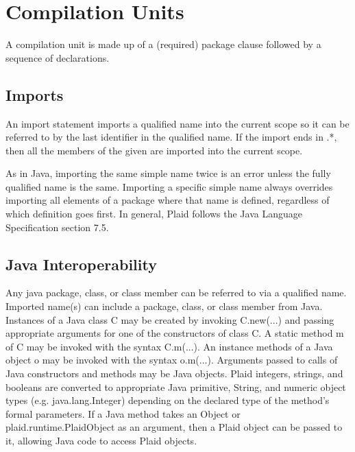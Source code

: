 \section{Compilation Units}

\begin{quote}


 {}  \code{;}  

\end{quote}

A compilation unit is made up of a (required) package clause followed
by a sequence of declarations.

\subsection{Imports}

\begin{quote}


 {}   \code{;}


 {}

\end{quote}

An import statement imports a qualified name into the current scope so
it can be referred to by the last identifier in the qualified name.
If the import ends in .*, then all the members of the given  are
imported into the current scope.

As in Java, importing the same simple name twice is an error unless
the fully qualified name is the same.  Importing a specific simple
name always overrides importing all elements of a package where
that name is defined, regardless of which definition goes first.
In general, Plaid follows the Java Language Specification section
7.5.

\subsection{Java Interoperability}

  Any java package, class, or
class member can be referred to via a qualified name.  Imported
name(s) can include a package, class, or class member from Java.
Instances of a Java class C may be created by invoking C.new(...)  and
passing appropriate arguments for one of the constructors of class C.
A static method m of C may be invoked with the syntax C.m(...).  An
instance methods of a Java object o may be invoked with the syntax
o.m(...).  Arguments passed to calls of Java constructors and methods
may be Java objects.  Plaid integers, strings, and booleans are
converted to appropriate Java primitive, String, and numeric object
types (e.g. java.lang.Integer) depending on the declared type of the
method's formal parameters.  If a Java method takes an Object or
plaid.runtime.PlaidObject as an argument, then a Plaid object can be
passed to it, allowing Java code to access Plaid objects.

